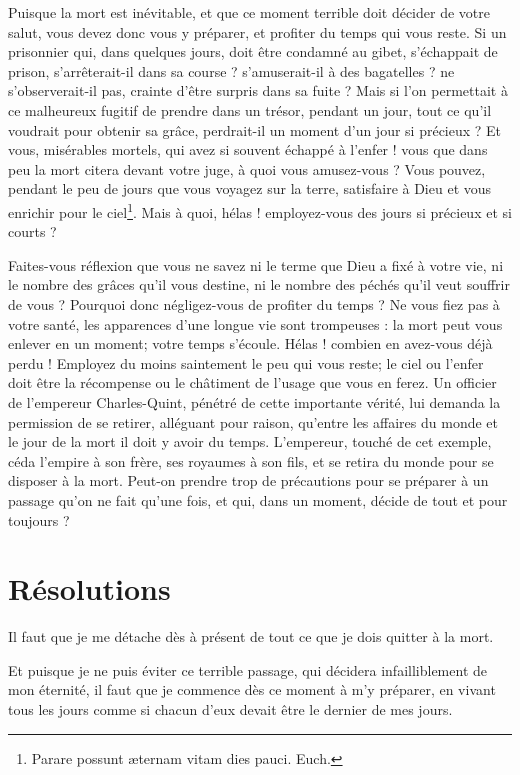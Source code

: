 \documentclass[instructions.tex]{subfiles}
\begin{document}
\secundo Puisque la mort est inévitable, et que ce moment terrible doit décider de votre salut, vous devez donc vous y préparer, et profiter du temps qui vous reste. Si un prisonnier qui, dans quelques jours, doit être condamné au gibet, s’échappait de prison, s’arrêterait-il dans sa course ? s’amuserait-il à des bagatelles ? ne s’observerait-il pas, crainte d’être surpris dans sa fuite ? Mais si l’on permettait à ce malheureux fugitif de prendre dans un trésor, pendant un jour, tout ce qu’il voudrait pour obtenir sa grâce, perdrait-il un moment d’un jour si précieux ? Et vous, misérables mortels, qui avez si souvent échappé à l’enfer ! vous que dans peu la mort citera devant votre juge, à quoi vous amusez-vous ? Vous pouvez, pendant le peu de jours que vous voyagez sur la terre, satisfaire à Dieu et vous enrichir pour le ciel\footnote{Parare possunt æternam vitam dies pauci. Euch.}. Mais à quoi, hélas ! employez-vous des jours si précieux et si courts ?
 
Faites-vous réflexion que vous ne savez ni le terme que Dieu a fixé à votre vie, ni le nombre des grâces qu’il vous destine, ni le nombre des péchés qu’il veut souffrir de vous ? Pourquoi donc négligez-vous de profiter du temps ? Ne vous fiez pas à votre santé, les apparences d’une longue vie sont trompeuses : la mort peut vous enlever en un moment; votre temps s’écoule. Hélas ! combien en avez-vous déjà perdu ! Employez du moins saintement le peu qui vous reste; le ciel ou l’enfer doit être la récompense ou le châtiment de l’usage que vous en ferez. Un officier de l’empereur Charles-Quint, pénétré de cette importante vérité, lui demanda la permission de se retirer, alléguant pour raison, qu’entre les affaires du monde et le jour de la mort il doit y avoir du temps. L’empereur, touché de cet exemple, céda l’empire à son frère, ses royaumes à son fils, et se retira du monde pour se disposer à la mort. Peut-on prendre trop de précautions pour se préparer à un passage qu’on ne fait qu’une fois, et qui, dans un moment, décide de tout et pour toujours ?
 
\section{Résolutions}
 
\primo Il faut que je me détache dès à présent de tout ce que je dois quitter à la mort. 

\secundo Et puisque je ne puis éviter ce terrible passage, qui décidera infailliblement de mon éternité, il faut que je commence dès ce moment à m’y préparer, en vivant tous les jours comme si chacun d’eux devait être le dernier de mes jours. 
 
\end{document}
